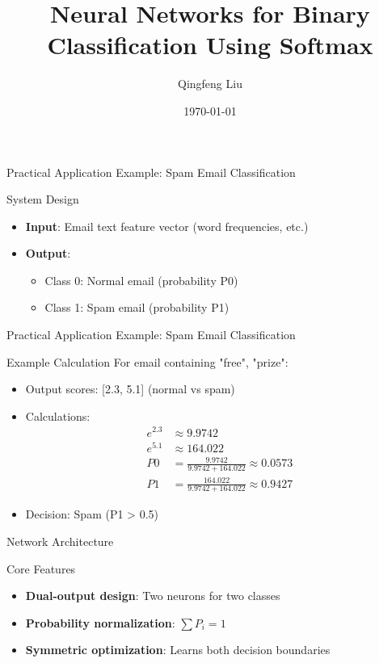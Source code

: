 \documentclass{beamer}
\title{Neural Networks for Binary Classification Using Softmax}
\author{Qingfeng Liu}
\institute{Hosei University}
\date{\today}
\begin{document}
	
	\frame{\titlepage}
	
	\begin{frame}{Practical Application Example: Spam Email Classification}
		\begin{block}{System Design}
			\begin{itemize}
				\item \textbf{Input}: Email text feature vector (word frequencies, etc.)
				\item \textbf{Output}:
				\begin{itemize}
					\item Class 0: Normal email (probability P0)
					\item Class 1: Spam email (probability P1)
				\end{itemize}
			\end{itemize}
		\end{block}
			\end{frame}
	
\begin{frame}{Practical Application Example: Spam Email Classification}
		\begin{exampleblock}{Example Calculation}
			For email containing "free", "prize":
			\begin{itemize}
				\item Output scores: [2.3, 5.1] (normal vs spam)
				\item Calculations:
				\begin{align*}
					e^{2.3} &\approx 9.9742 \\
					e^{5.1} &\approx 164.022 \\
					P0 &= \frac{9.9742}{9.9742+164.022} \approx 0.0573 \\
					P1 &= \frac{164.022}{9.9742+164.022} \approx 0.9427
				\end{align*}
				\item Decision: Spam (P1 > 0.5)
			\end{itemize}
		\end{exampleblock}
	\end{frame}
	
	\begin{frame}{Network Architecture}
		
		\begin{block}{Core Features}
			\begin{itemize}
				\item \textbf{Dual-output design}: Two neurons for two classes
				\item \textbf{Probability normalization}: $\sum P_i = 1$
				\item \textbf{Symmetric optimization}: Learns both decision boundaries
			\end{itemize}
		\end{block}
	\end{frame}
	
\end{document}
